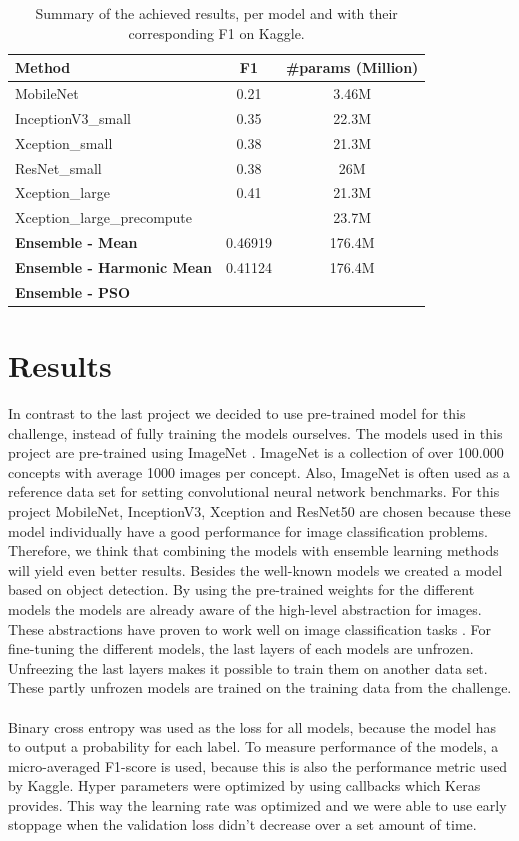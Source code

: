 \documentclass[twocolumn]{article}
\begin{document}
        
        \begin{table}[t]
			\centering
			\begin{tabular}{l|c|c}
				\toprule
				\textbf{Method} & \textbf{F1} & \textbf{\#params (Million)}\\
				\midrule
				MobileNet & 0.21 & 3.46M \\
				InceptionV3\_small & 0.35 & 22.3M\\
				Xception\_small & 0.38 & 21.3M\\
				ResNet\_small & 0.38 & 26M\\
				Xception\_large & 0.41 & 21.3M\\
               	Xception\_large\_precompute & & 23.7M\\
				\midrule
				\textbf{Ensemble - Mean} & 0.46919 & 176.4M \\
				\textbf{Ensemble - Harmonic Mean} & 0.41124 & 176.4M \\
				\textbf{Ensemble - PSO} & & \\
				\bottomrule
			\end{tabular}
			\caption{Summary of the achieved results, per model and with their corresponding F1 on Kaggle.}
			\label{table:summary_results}
		\end{table}
        
        
		\section{Results}
		In contrast to the last project we decided to use pre-trained model for this challenge, instead of fully training the models ourselves. The models used in this project are pre-trained using ImageNet \cite{deng2009imagenet}. ImageNet is a collection of over 100.000 concepts with average 1000 images per concept. Also, ImageNet is often used as a reference data set for setting convolutional neural network benchmarks. For this project MobileNet, InceptionV3, Xception and ResNet50 are chosen because these model individually have a good performance for image classification problems. Therefore, we think that combining the models with ensemble learning methods will yield even better results. Besides the well-known models we created a model based on object detection. By using the pre-trained weights for the different models the models are already aware of the high-level abstraction for images. These abstractions have proven to work well on image classification tasks \cite{razavian2014cnn}. For fine-tuning the different models, the last layers of each models are unfrozen. Unfreezing the last layers makes it possible to train them on another data set. These partly unfrozen models are trained on the training data from the challenge.
		\\
		\\
		Binary cross entropy was used as the loss for all models, because the model has to output a probability for each label. To measure performance of the models, a micro-averaged F1-score is used, because this is also the performance metric used by Kaggle. Hyper parameters were optimized by using callbacks which Keras provides. This way the learning rate was optimized and we were able to use early stoppage when the validation loss didn't decrease over a set amount of time.
	
\end{document}
